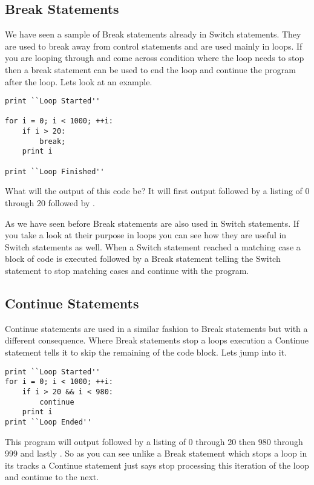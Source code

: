 {\subsection{Break Statements}
We have seen a sample of Break statements already in Switch statements.
They are used to break away from control statements and are used mainly in loops.
If you are looping through and come across condition where the loop needs to stop then a break statement can be used to end the loop and continue the 
program after the loop.
Lets look at an example.

\begin{lstlisting}[caption={Break Statement}]
print ``Loop Started''

for i = 0; i < 1000; ++i:
    if i > 20:
        break;
    print i

print ``Loop Finished''
\end{lstlisting}

What will the output of this code be?
It will first output  followed by a listing of 0 through 20 followed by .
\par

As we have seen before Break statements are also used in Switch statements.
If you take a look at their purpose in loops you can see how they are useful in Switch statements as well.
When a Switch statement reached a matching case a block of code is executed followed by a Break statement telling the Switch statement to
stop matching cases and continue with the program.

\subsection{Continue Statements}
Continue statements are used in a similar fashion to Break statements but with a different consequence.
Where Break statements stop a loops execution a Continue statement tells it to skip the remaining of the code block.
Lets jump into it.

\begin{lstlisting}[caption={Continue Statement}]
print ``Loop Started''
for i = 0; i < 1000; ++i:
    if i > 20 && i < 980:
        continue
    print i
print ``Loop Ended''
\end{lstlisting}

This program will output  followed by a listing of 0 through 20 then 980 through 999 and lastly .
So as you can see unlike a Break statement which stops a loop in its tracks a Continue statement just says stop processing this iteration of the loop and continue to the next.

}
